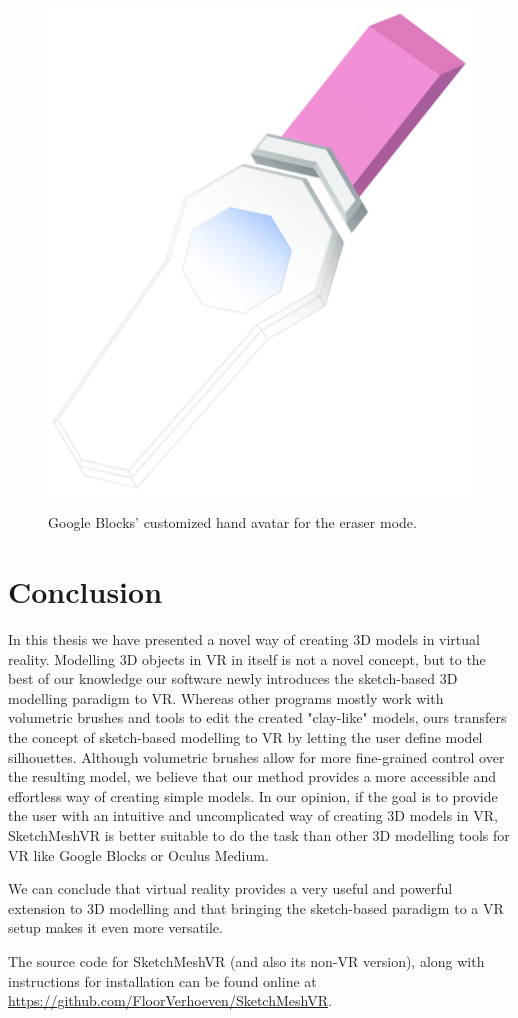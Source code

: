 \begin{figure}[!h]
    \centering
    \includegraphics[width=0.3\linewidth]{figures/blocks_tool}\\
    \caption[Google Blocks tool meshes]{Google Blocks' customized hand avatar for the eraser mode.
      \label{fig:blocks_tool}}
\end{figure}

\section{Conclusion}
In this thesis we have presented a novel way of creating 3D models in virtual reality. Modelling 3D objects in VR in itself is not a novel concept, but to the best of our knowledge our software newly introduces the sketch-based 3D modelling paradigm to VR. Whereas other programs mostly work with volumetric brushes and tools to edit the created "clay-like" models, ours transfers the concept of sketch-based modelling to VR by letting the user define model silhouettes. Although volumetric brushes allow for more fine-grained control over the resulting model, we believe that our method provides a more accessible and effortless way of creating simple models. In our opinion, if the goal is to provide the user with an intuitive and uncomplicated way of creating 3D models in VR, SketchMeshVR is better suitable to do the task than other 3D modelling tools for VR like Google Blocks or Oculus Medium. 

We can conclude that virtual reality provides a very useful and powerful extension to 3D modelling and that bringing the sketch-based paradigm to a VR setup makes it even more versatile.

The source code for SketchMeshVR (and also its non-VR version), along with instructions for installation can be found online at \url{https://github.com/FloorVerhoeven/SketchMeshVR}. 